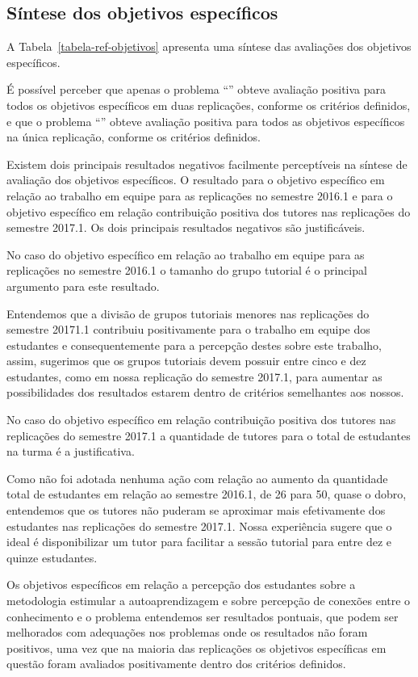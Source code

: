 \subsection{Síntese dos objetivos específicos}
A Tabela~\ref{tabela-ref-objetivos} apresenta
uma síntese das avaliações dos objetivos específicos.


É possível perceber que apenas o problema ``\ProblemaD'' obteve
avaliação positiva para todos os objetivos específicos em duas
replicações, conforme os critérios definidos, e que o
problema ``\ProblemaA'' obteve avaliação positiva para todos as
objetivos específicos na única replicação, conforme os
critérios definidos.

Existem dois principais resultados negativos facilmente
perceptíveis na síntese de avaliação dos objetivos
específicos.
O resultado para o objetivo específico em relação ao trabalho em equipe
para as replicações no semestre 2016.1 e para o objetivo
específico em relação contribuição positiva dos tutores nas
replicações do semestre 2017.1.
Os dois principais resultados negativos são justificáveis.

No caso do objetivo específico em relação ao trabalho em equipe
para as replicações no semestre 2016.1 o tamanho
do grupo tutorial é o principal argumento
para este resultado.

Entendemos que a divisão de grupos tutoriais menores
nas replicações do semestre 20171.1 contribuiu
positivamente para o trabalho em equipe dos
estudantes e consequentemente para a percepção destes
sobre este trabalho, assim, sugerimos que os
grupos tutoriais devem possuir entre cinco e dez estudantes,
como em nossa replicação do semestre 2017.1, para aumentar
as possibilidades dos resultados estarem dentro de critérios
semelhantes aos nossos.

No caso do objetivo específico em relação contribuição positiva
dos tutores nas replicações do semestre 2017.1 a quantidade de
tutores para o total de estudantes na turma é a justificativa.

Como não foi adotada nenhuma ação com relação ao aumento da
quantidade total de estudantes em relação ao semestre 2016.1,
de 26 para 50, quase o dobro, entendemos que os tutores não
puderam se aproximar mais efetivamente dos estudantes
nas replicações do semestre 2017.1.
Nossa experiência sugere que o ideal é disponibilizar um
tutor para facilitar a sessão tutorial para entre dez e
quinze estudantes.

Os objetivos específicos em relação a percepção dos estudantes sobre
a metodologia estimular a autoaprendizagem e sobre percepção de
conexões entre o conhecimento e o problema entendemos ser
resultados pontuais, que podem ser melhorados com adequações nos problemas
onde os resultados não foram positivos, uma vez que na maioria das replicações
os objetivos específicas em questão foram avaliados positivamente
dentro dos critérios definidos.
